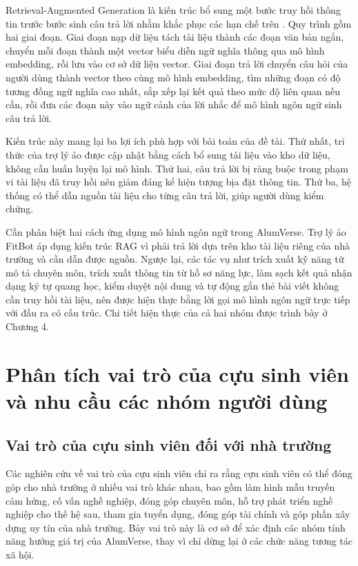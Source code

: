 \documentclass[12pt,a4paper,oneside]{report}
\begin{document}
Retrieval-Augmented Generation là kiến trúc bổ sung một bước truy hồi thông tin trước bước sinh câu trả lời nhằm khắc phục các hạn chế trên \cite{rag}. Quy trình gồm hai giai đoạn. Giai đoạn nạp dữ liệu tách tài liệu thành các đoạn văn bản ngắn, chuyển mỗi đoạn thành một vector biểu diễn ngữ nghĩa thông qua mô hình embedding, rồi lưu vào cơ sở dữ liệu vector. Giai đoạn trả lời chuyển câu hỏi của người dùng thành vector theo cùng mô hình embedding, tìm những đoạn có độ tương đồng ngữ nghĩa cao nhất, sắp xếp lại kết quả theo mức độ liên quan nếu cần, rồi đưa các đoạn này vào ngữ cảnh của lời nhắc để mô hình ngôn ngữ sinh câu trả lời.

Kiến trúc này mang lại ba lợi ích phù hợp với bài toán của đề tài. Thứ nhất, tri thức của trợ lý ảo được cập nhật bằng cách bổ sung tài liệu vào kho dữ liệu, không cần huấn luyện lại mô hình. Thứ hai, câu trả lời bị ràng buộc trong phạm vi tài liệu đã truy hồi nên giảm đáng kể hiện tượng bịa đặt thông tin. Thứ ba, hệ thống có thể dẫn nguồn tài liệu cho từng câu trả lời, giúp người dùng kiểm chứng.

Cần phân biệt hai cách ứng dụng mô hình ngôn ngữ trong AlumVerse. Trợ lý ảo FitBot áp dụng kiến trúc RAG vì phải trả lời dựa trên kho tài liệu riêng của nhà trường và cần dẫn được nguồn. Ngược lại, các tác vụ như trích xuất kỹ năng từ mô tả chuyên môn, trích xuất thông tin từ hồ sơ năng lực, làm sạch kết quả nhận dạng ký tự quang học, kiểm duyệt nội dung và tự động gắn thẻ bài viết không cần truy hồi tài liệu, nên được hiện thực bằng lời gọi mô hình ngôn ngữ trực tiếp với đầu ra có cấu trúc. Chi tiết hiện thực của cả hai nhóm được trình bày ở Chương 4.

\section{Phân tích vai trò của cựu sinh viên và nhu cầu các nhóm người dùng}

\subsection{Vai trò của cựu sinh viên đối với nhà trường}

Các nghiên cứu về vai trò của cựu sinh viên chỉ ra rằng cựu sinh viên có thể đóng góp cho nhà trường ở nhiều vai trò khác nhau, bao gồm làm hình mẫu truyền cảm hứng, cố vấn nghề nghiệp, đóng góp chuyên môn, hỗ trợ phát triển nghề nghiệp cho thế hệ sau, tham gia tuyển dụng, đóng góp tài chính và góp phần xây dựng uy tín của nhà trường. Bảy vai trò này là cơ sở để xác định các nhóm tính năng hướng giá trị của AlumVerse, thay vì chỉ dừng lại ở các chức năng tương tác xã hội.
\end{document}
